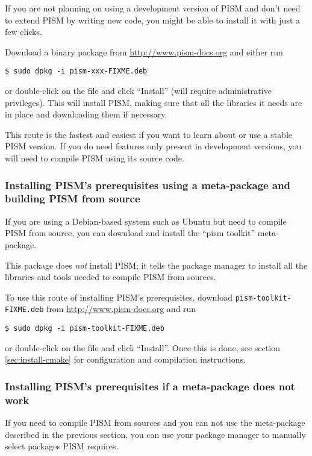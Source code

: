 \documentclass[11pt,final]{amsart}
\begin{document}
If you are not planning on using a development version of PISM and don't need to extend PISM by writing new code, you might be
able to install it with just a few clicks.

Download a binary package from \url{http://www.pism-docs.org} and either run
\begin{verbatim}
$ sudo dpkg -i pism-xxx-FIXME.deb
\end{verbatim}%
or double-click on the file and click ``Install'' (will require administrative privileges). This will install PISM, making sure that
all the libraries it needs are in place and downloading them if necessary.

This route is the fastest and easiest if you want to learn about or use a stable PISM version. If you do need features only
present in development versions, you will need to compile PISM using its source code.

\subsubsection{Installing PISM's prerequisites using a meta-package and building PISM from source}
\label{sec:deb-pism-toolkit}

If you are using a Debian-based system such as Ubuntu but need to compile PISM from source, you can download and install the
``pism toolkit'' meta-package.

This package does \emph{not} install PISM; it tells the package manager to install all the libraries and tools needed to compile
PISM from sources.

To use this route of installing PISM's prerequisites, download \texttt{pism-toolkit-FIXME.deb} from \url{http://www.pism-docs.org} and run
\begin{verbatim}
$ sudo dpkg -i pism-toolkit-FIXME.deb
\end{verbatim}%
or double-click on the file and click ``Install''. Once this is done, see section \ref{sec:install-cmake} for configuration and
compilation instructions.

\subsubsection{Installing PISM's prerequisites if a meta-package does not work}
\label{sec:deb-libraries-by-hand}

If you need to compile PISM from sources and you can not use the meta-package described in the previous section, you can use your
package manager to manually select packages PISM requires.
\end{document}

